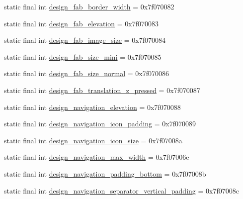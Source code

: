 \begin{CompactItemize}
\item 
static final int \hyperlink{classandroid_1_1support_1_1graphics_1_1drawable_1_1_r_1_1dimen_096c106a508bb2a7f1816ff1d8382c98}{design\_\-fab\_\-border\_\-width} = 0x7f070082
\item 
static final int \hyperlink{classandroid_1_1support_1_1graphics_1_1drawable_1_1_r_1_1dimen_1a7b1e6c4bf548ec78359076a4df54dd}{design\_\-fab\_\-elevation} = 0x7f070083
\item 
static final int \hyperlink{classandroid_1_1support_1_1graphics_1_1drawable_1_1_r_1_1dimen_140cf7c8d5b039a5749ba43dabd82dee}{design\_\-fab\_\-image\_\-size} = 0x7f070084
\item 
static final int \hyperlink{classandroid_1_1support_1_1graphics_1_1drawable_1_1_r_1_1dimen_6b51a050de06b46bb25cea5f5458c4de}{design\_\-fab\_\-size\_\-mini} = 0x7f070085
\item 
static final int \hyperlink{classandroid_1_1support_1_1graphics_1_1drawable_1_1_r_1_1dimen_0bb9d39ac22f4ad2119c644e507c7afd}{design\_\-fab\_\-size\_\-normal} = 0x7f070086
\item 
static final int \hyperlink{classandroid_1_1support_1_1graphics_1_1drawable_1_1_r_1_1dimen_eab3c31035363df1b4a1653971930669}{design\_\-fab\_\-translation\_\-z\_\-pressed} = 0x7f070087
\item 
static final int \hyperlink{classandroid_1_1support_1_1graphics_1_1drawable_1_1_r_1_1dimen_ffcc2841d33829c6d6cf3d3296a1afa1}{design\_\-navigation\_\-elevation} = 0x7f070088
\item 
static final int \hyperlink{classandroid_1_1support_1_1graphics_1_1drawable_1_1_r_1_1dimen_e96ac9f2f608f94177ecb9a8f53f3251}{design\_\-navigation\_\-icon\_\-padding} = 0x7f070089
\item 
static final int \hyperlink{classandroid_1_1support_1_1graphics_1_1drawable_1_1_r_1_1dimen_822543b9035a99f6f5285a6828e05bb3}{design\_\-navigation\_\-icon\_\-size} = 0x7f07008a
\item 
static final int \hyperlink{classandroid_1_1support_1_1graphics_1_1drawable_1_1_r_1_1dimen_d2517afed61f5a0217315dbe969b6147}{design\_\-navigation\_\-max\_\-width} = 0x7f07006e
\item 
static final int \hyperlink{classandroid_1_1support_1_1graphics_1_1drawable_1_1_r_1_1dimen_80fe68e0f989b55c7d38469227f480da}{design\_\-navigation\_\-padding\_\-bottom} = 0x7f07008b
\item 
static final int \hyperlink{classandroid_1_1support_1_1graphics_1_1drawable_1_1_r_1_1dimen_b22a462155e1ce0d601e4e5bb5394696}{design\_\-navigation\_\-separator\_\-vertical\_\-padding} = 0x7f07008c

\end{CompactItemize}
